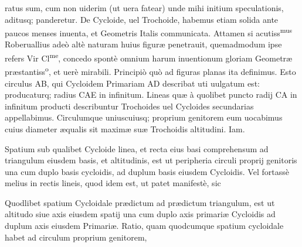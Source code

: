 \documentclass[11pt,a4paper]{article}
\begin{document}

ratus sum, cum non uiderim (ut uera fatear) unde mihi initium speculationis, aditusq; panderetur. De Cycloide, uel Trochoide, habemus etiam solida ante paucos menses inuenta, et Geometris Italis communicata. Attamen si acutiss\textsuperscript{mus} Roberuallius adeò altè naturam huius figuræ penetrauit, quemadmodum ipse refers Vir Cl\textsuperscript{me}, concedo spontè omnium harum inuentionum gloriam Geometræ præstantiss\textsuperscript{o}, et uerè mirabili. Principiò quò ad figuras planas ita definimus. Esto circulus AB, qui Cycloidem Primariam AD describat uti uulgatum est: producaturq; radius CAE in infinitum. Lineas quæ à quolibet puncto radij CA in infinitum producti describuntur Trochoides uel Cycloides secundarias appellabimus. Circulumque uniuscuiusq; proprium genitorem eum uocabimus cuius diameter æqualis sit maximæ suæ Trochoidis altitudini. Iam.

Spatium sub qualibet Cycloide linea, et recta eius basi comprehensum ad triangulum eiusdem basis, et altitudinis, est ut peripheria circuli proprij genitoris una cum duplo basis cycloidis, ad duplum basis eiusdem Cycloidis. Vel fortassè melius in rectis lineis, quod idem est, ut patet manifestè, sic

Quodlibet spatium Cycloidale prædictum ad prædictum triangulum, est ut altitudo siue axis eiusdem spatij una cum duplo axis primariæ Cycloidis ad duplum axis eiusdem Primariæ. Ratio, quam quodcumque spatium cycloidale habet ad circulum proprium genitorem, 

\end{document}
